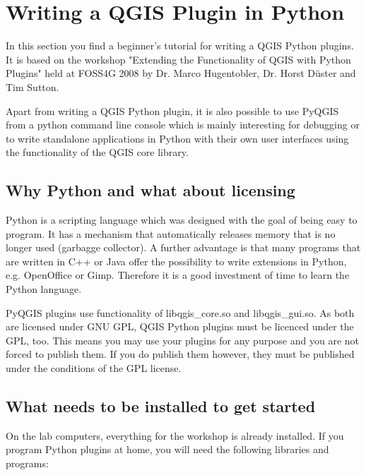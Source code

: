 
\section{Writing a QGIS Plugin in Python}

\updatedisclaimer

In this section you find a beginner's tutorial for writing a QGIS Python
plugins. It is based on the workshop "Extending the Functionality of QGIS
with Python Plugins" held at FOSS4G 2008 by Dr. Marco Hugentobler, Dr. Horst
D\"uster and Tim Sutton. 

Apart from writing a QGIS Python plugin, it is also possible to use PyQGIS
from a python command line console which is mainly interesting for debugging
or to write standalone applications in Python with their own user interfaces
using the functionality of the QGIS core library.

\subsection{Why Python and what about licensing}

Python is a scripting language which was designed with the goal of being easy
to program. It has a mechanism that automatically releases memory that is no
longer used (garbagge collector). A further advantage is that many programs
that are written in C++ or Java offer the possibility to write extensions in
Python, e.g. OpenOffice or Gimp. Therefore it is a good investment of time to
learn the Python language.

PyQGIS plugins use functionality of libqgis\_core.so and libqgis\_gui.so. As
both are licensed under GNU GPL, QGIS Python plugins must be licenced under the
GPL, too. This means you may use your plugins for any purpose and you are not
forced to publish them. If you do publish them however, they must be
published under the conditions of the GPL license. 

\subsection{What needs to be installed to get started}

On the lab computers, everything for the workshop is already installed. If
you program Python plugins at home, you will need the following libraries and
programs:

